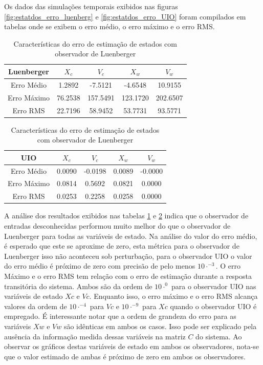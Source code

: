 Os dados das simulações temporais exibidos nas figuras \ref{fig:estatdos_erro_luenberg} e \ref{fig:estatdos_erro_UIO} foram compilados em tabelas onde se exibem o erro médio, o erro máximo e o erro RMS.
\FloatBarrier
\begin{table}[h!]
\footnotesize
\centering
    \begin{tabular}{|c|c|c|c|c|}
        \hline
        Luenberger & $X_c$& $V_c$& $X_w$& $V_w$\\
        \hline
        \hline
         Erro Médio&  1.2892&   -7.5121&   -4.6548&   10.9155\\ 
         Erro Máximo& 76.2538&  157.5491&  123.1720&  202.6507\\ 
         Erro RMS&    22.7196&   58.9452&   53.7731&   93.5771\\
        \hline
    \end{tabular} \label{tb:comparacao_erro_estado_LUE}\caption{Características do erro de estimação de estados com observador de Luenberger}
\end{table}

\begin{table}[h!]
\footnotesize
\centering
    \begin{tabular}{|c|c|c|c|c|}
        \hline
        UIO & $X_c$& $V_c$& $X_w$& $V_w$\\
        \hline
        \hline
         Erro Médio&  0.0090&   -0.0198&    0.0089&   -0.0000\\ 
         Erro Máximo& 0.0814&    0.5692&    0.0821&    0.0000\\ 
         Erro RMS&    0.0253&    0.2258&    0.0258&    0.0000\\
        \hline
    \end{tabular} \label{tb:comparacao_erro_estados_UIO}\caption{Características do erro de estimação de estados com observador de Luenberger}
\end{table}
\FloatBarrier

A análise dos resultados exibidos nas tabelas \ref{tb:comparacao_erro_estado_LUE} e \ref{tb:comparacao_erro_estados_UIO} indica que o observador de entradas desconhecidas performou muito melhor do que o observador de Luenberger para todas as variáveis de estado. 
Na análise do valor do erro médio, é esperado que este se aproxime de zero, esta métrica para o observador de Luenberger isso não aconteceu sob perturbação, para o observador UIO o valor do erro médio é próximo de zero com precisão de pelo menos $10\cdot^{-3}$. 
O erro Máximo e o erro RMS tem relação com o erro de estimação durante a resposta transitória do sistema. Ambos são da ordem de $10\cdot^{0}$ para o observador UIO nas variáveis de estado $Xc$ e $Vc$. Enquanto isso, o erro máximo e o erro RMS alcança valores da ordem de $10\cdot^{-4}$ para $Vc$ e $10\cdot^{-9}$ para $Xc$ quando o observador UIO é empregado.
É interessante notar que a ordem de grandeza do erro para as variáveis $Xw$ e $Vw$ são idênticas em ambos os casos. Isso pode ser explicado pela ausência da informação medida dessas variáveis na matriz $C$ do sistema. Ao observar os gráficos destas variáveis de estado em ambos os observadores, nota-se que o valor estimado de ambas é próximo de zero em ambos os observadores.

